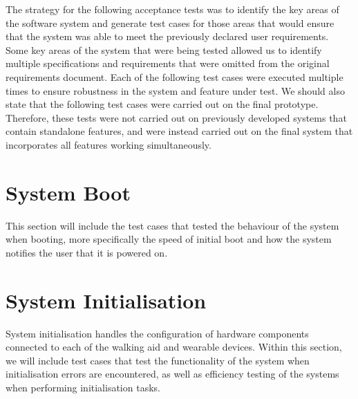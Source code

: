     The strategy for the following acceptance tests was to identify the key areas of the software system and generate test cases for those areas that would ensure that the system was able to meet the previously declared user requirements. Some key areas of the system that were being tested allowed us to identify multiple specifications and requirements that were omitted from the original requirements document. Each of the following test cases were executed multiple times to ensure robustness in the system and feature under test. We should also state that the following test cases were carried out on the final prototype. Therefore, these tests were not carried out on previously developed systems that contain standalone features, and were instead carried out on the final system that incorporates all features working simultaneously.


    \section{System Boot}
    \label{sec:test_boot}

        This section will include the test cases that tested the behaviour of the system when booting, more specifically the speed of initial boot and how the system notifies the user that it is powered on.

        \vspace{1em}
        

        \vspace{4em}
        

        \vspace{4em}
        

        \vspace{4em}
        

    \section{System Initialisation}
    \label{sec:test_init}

        System initialisation handles the configuration of hardware components connected to each of the walking aid and wearable devices. Within this section, we will include test cases that test the functionality of the system when initialisation errors are encountered, as well as efficiency testing of the systems when performing initialisation tasks.

